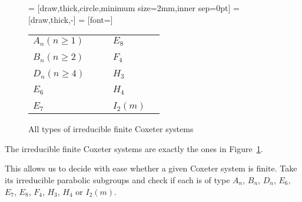 \begin{figure}
	\centering
	 = [draw,thick,circle,minimum size=2mm,inner sep=0pt]
	 = [draw,thick,-]
	 = [font=\small]

	\begin{tabular}{MMcMM}
	$A_n (n \geq 1)$
	&
	\An
	&
	\hspace*{\cgpadh}
	&
	$E_8$
	&
	\Eeight
	\\
	\vspace*{\cgpadv}
	\\
	$B_n (n \geq 2)$
	&
	\Bn
	&
	\hspace*{\cgpadh}
	&
	$F_4$
	&
	\Ffour
	\\
	\vspace*{\cgpadv}
	\\
	$D_n (n \geq 4)$
	&
	\Dn
	&
	\hspace*{\cgpadh}
	&
	$H_3$
	&
	\Hthree
	\\
	\vspace*{\cgpadv}
	\\
	$E_6$
	&
	\Esix
	&
	\hspace*{\cgpadh}
	&
	$H_4$
	&
	\Hfour
	\\
	\vspace*{\cgpadv}
	\\
	$E_7$
	&
	\Eseven
	&
	\hspace*{\cgpadh}
	&
	$I_2(m)$
	&
	\Itwom
	\end{tabular}
	\caption{All types of irreducible finite Coxeter systems}
	\label{fig:finite-coxeter-systems}
\end{figure}

\begin{theo}
	The irreducible finite Coxeter systems are exactly the ones in Figure~\ref{fig:finite-coxeter-systems}.
\end{theo}

This allows us to decide with ease whether a given Coxeter system is finite. Take its irreducible parabolic subgroups and check if each is of type $A_n$, $B_n$, $D_n$, $E_6$, $E_7$, $E_8$, $F_4$, $H_3$, $H_4$ or $I_2(m)$.